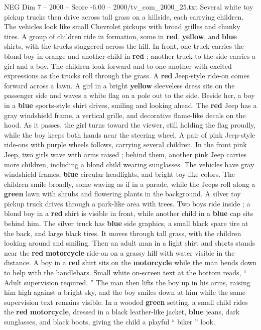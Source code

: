 \begin{textsample}{NEG Dim 7 – 2000 – Score -6.00 – 2000/tv\_com\_2000\_25.txt}
Several white toy pickup trucks then drive across tall grass on a hillside, each carrying children.
The vehicles look like small Chevrolet pickups with broad grilles and chunky tires.
A group of children ride in formation, some in \textbf{red}, \textbf{yellow}, and \textbf{blue} shirts, with the trucks staggered across the hill.
In front, one truck carries the blond boy in orange and another child in \textbf{red} ; another truck to the side carries a girl and a boy.
The children look forward and to one another with excited expressions as the trucks roll through the grass.
A \textbf{red} Jeep-style ride-on comes forward across a lawn.
A girl in a bright \textbf{yellow} sleeveless dress sits on the passenger side and waves a white flag on a pole out to the side.
Beside her, a boy in a \textbf{blue} sports-style shirt drives, smiling and looking ahead.
The \textbf{red} Jeep has a gray windshield frame, a vertical grille, and decorative flame-like decals on the hood.
As it passes, the girl turns toward the viewer, still holding the flag proudly, while the boy keeps both hands near the steering wheel.
A pair of pink Jeep-style ride-ons with purple wheels follows, carrying several children.
In the front pink Jeep, two girls wave with arms raised ; behind them, another pink Jeep carries more children, including a blond child wearing sunglasses.
The vehicles have gray windshield frames, \textbf{blue} circular headlights, and bright toy-like colors.
The children smile broadly, some waving as if in a parade, while the Jeeps roll along a \textbf{green} lawn with shrubs and flowering plants in the background.
A silver toy pickup truck drives through a park-like area with trees.
Two boys ride inside ; a blond boy in a \textbf{red} shirt is visible in front, while another child in a \textbf{blue} cap sits behind him.
The silver truck has \textbf{blue} side graphics, a small black spare tire at the back, and large black tires.
It moves through tall grass, with the children looking around and smiling.
Then an adult man in a light shirt and shorts stands near the \textbf{red} \textbf{motorcycle} ride-on on a grassy hill with water visible in the distance.
A boy in a \textbf{red} shirt sits on the \textbf{motorcycle} while the man bends down to help with the handlebars.
Small white on-screen text at the bottom reads, “ Adult supervision required. ” The man then lifts the boy up in his arms, raising him high against a bright sky, and the boy smiles down at him while the same supervision text remains visible.
In a wooded \textbf{green} setting, a small child rides the \textbf{red} \textbf{motorcycle}, dressed in a black leather-like jacket, \textbf{blue} jeans, dark sunglasses, and black boots, giving the child a playful “ biker ” look.

\end{textsample}
